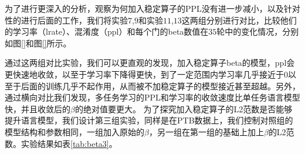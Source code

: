 为了进行更深入的分析，观察为何加入稳定算子的PPL没有进一步减小，以及针对性的进行后面的工作，我们将实验$7$,$9$和实验$11$,$13$这两组分别进行对比，比较他们的学习率（lrate）、混淆度（ppl）和每个门的beta数值在$35$轮中的变化情况，分别如图\ref{}和图\ref{}所示。
\begin{figure}[!htbp]
  \centering
  \begin{minipage}[b]{0.6\textwidth}
    \captionstyle{\centering}
    \centering
  \end{minipage}     
\end{figure}


\begin{figure}[!htbp]
  \centering
  \begin{minipage}[b]{0.6\textwidth}
    \captionstyle{\centering}
    \centering
  \end{minipage}     
\end{figure}

通过这两组对比实验，我们可以更直观的发现，加入稳定算子beta的模型，ppl会更快速地收敛，以至于学习率下降得更快，到了一定范围内学习率几乎接近于$0$以至于后面的训练几乎不起作用，从而被不加稳定算子的模型接近甚至超越。另外，通过横向对比我们发现，多任务学习的PPL和学习率的收敛速度比单任务语言模型快，并且收敛后的$\beta$的绝对值要更大。
	为了探究加入稳定算子的L2范数是否能够提升语言模型，我们设计第三组实验，同样是在PTB数据上，我们控制对照组的模型结构和参数相同，一组加入原始的$\beta$，另一组在第一组的基础上加上$\beta$的L2范数。实验结果如表\ref{tab:beta3}。
    

